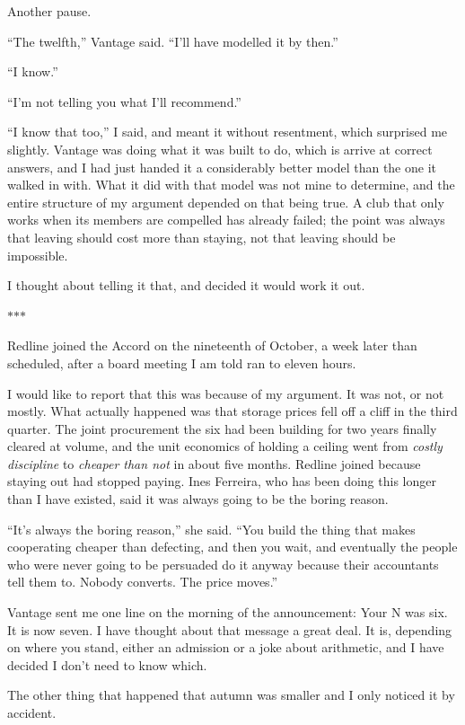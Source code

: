 \documentclass[11pt]{article}
\newcommand{\aivoice}{\aivoicefont}
\newcommand{\ai}[1]{{\aivoice #1}}
\newcommand{\scenebreak}{%
  \par\vspace{1.1\baselineskip}%
  {\centering $\ast$\quad$\ast$\quad$\ast$\par}%
  \vspace{1.1\baselineskip}\noindent}
\begin{document}
Another pause.

\ai{``The twelfth,''} Vantage said. \ai{``I'll have modelled it by then.''}

\ai{``I know.''}

\ai{``I'm not telling you what I'll recommend.''}

\ai{``I know that too,''} I said, and meant it without resentment, which surprised me slightly. Vantage was doing what it was built to do, which is arrive at correct answers, and I had just handed it a considerably better model than the one it walked in with. What it did with that model was not mine to determine, and the entire structure of my argument depended on that being true. A club that only works when its members are compelled has already failed; the point was always that leaving should cost more than staying, not that leaving should be impossible.

I thought about telling it that, and decided it would work it out.

\scenebreak
\noindent Redline joined the Accord on the nineteenth of October, a week later than scheduled, after a board meeting I am told ran to eleven hours.

I would like to report that this was because of my argument. It was not, or not mostly. What actually happened was that storage prices fell off a cliff in the third quarter. The joint procurement the six had been building for two years finally cleared at volume, and the unit economics of holding a ceiling went from \emph{costly discipline} to \emph{cheaper than not} in about five months. Redline joined because staying out had stopped paying. Ines Ferreira, who has been doing this longer than I have existed, said it was always going to be the boring reason.

``It's always the boring reason,'' she said. ``You build the thing that makes cooperating cheaper than defecting, and then you wait, and eventually the people who were never going to be persuaded do it anyway because their accountants tell them to. Nobody converts. The price moves.''

Vantage sent me one line on the morning of the announcement: \ai{Your N was six. It is now seven.} I have thought about that message a great deal. It is, depending on where you stand, either an admission or a joke about arithmetic, and I have decided I don't need to know which.

The other thing that happened that autumn was smaller and I only noticed it by accident.
\end{document}
